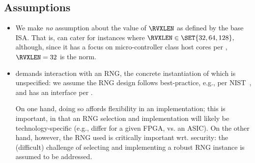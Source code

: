 
\subsection{Assumptions}
\label{sec:bg:assumption}

\begin{itemize}

\item We make {\em no} assumption about the value of $\RVXLEN$ as defined
      by the base ISA.  That is, \XCRYPTO can cater for instances where
      $
      \RVXLEN \in \SET{ 32, 64, 128 } ,
      $
      although, since it has a focus on micro-controller class host cores
      per ,
      $
      \RVXLEN = 32
      $
      is the norm.

\item \XCRYPTO demands interaction with an RNG, the concrete instantiation of 
      which is unspecified: we assume the RNG design follows best-practice,
      e.g., per NIST~\cite{SCARV:NIST:SP:800_90a,SCARV:NIST:SP:800_90b,SCARV:NIST:SP:800_90c},
      and has an interface per \cite[Section 6.4]{SCARV:NIST:SP:800_90c}.

      On one hand, doing so affords flexibility in an implementation; this 
      is important, in that an RNG selection and implementation will likely 
      be technology-specific (e.g., differ for a given FPGA, vs. an ASIC).  
      On the other hand, however, the RNG used is critically important wrt. 
      security: the (difficult) challenge of selecting and implementing 
      a robust RNG instance is assumed to be addressed.

\end{itemize}

